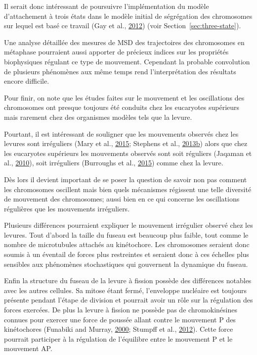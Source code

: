\documentclass[12pt,a4paper,twoside,openright]{book}
\begin{document}
Il serait donc intéressant de poursuivre l'implémentation du modèle
d'attachement à trois états dans le modèle initial de ségrégation des
chromosomes sur lequel est basé ce travail (Gay et al.,
\protect\hyperlink{ref-Gay2012a}{2012}) (voir
Section~\ref{sec:three-state}).

Une analyse détaillée des mesures de MSD des trajectoires des
chromosomes en métaphase pourraient aussi apporter de précieux indices
sur les propriétés biophysiques régulant ce type de mouvement. Cependant
la probable convolution de plusieurs phénomènes aux même temps rend
l'interprétation des résultats encore difficile.

Pour finir, on note que les études faites sur le mouvement et les
oscillations des chromosomes ont presque toujours été conduits chez les
eucaryotes supérieurs mais rarement chez des organismes modèles tels que
la levure.

Pourtant, il est intéressant de souligner que les mouvements observés
chez les levures sont irréguliers (Mary et al.,
\protect\hyperlink{ref-Mary2015}{2015}; Stephens et al.,
\protect\hyperlink{ref-Stephens2013a}{2013}\protect\hyperlink{ref-Stephens2013a}{b})
alors que chez les eucaryotes supérieurs les mouvements observés sont
soit réguliers (Jaqaman et al.,
\protect\hyperlink{ref-Jaqaman2010}{2010}), soit irréguliers (Burroughs
et al., \protect\hyperlink{ref-Burroughs2015}{2015}) comme chez la
levure.

Dès lors il devient important de se poser la question de savoir non pas
comment les chromosomes oscillent mais bien quels mécanismes régissent
une telle diversité de mouvement des chromosomes; aussi bien en ce qui
concerne les oscillations régulières que les mouvements irréguliers.

Plusieurs différences pourraient expliquer le mouvement irrégulier
observé chez les levures. Tout d'abord la taille du fuseau est beaucoup
plus faible, tout comme le nombre de microtubules attachés au
kinétochore. Les chromosomes seraient donc soumis à un éventail de
forces plus restreintes et seraient donc à ces échelles plus sensibles
aux phénomènes stochastiques qui gouvernent la dynamique du fuseau.

Enfin la structure du fuseau de la levure à fission possède des
différences notables avec les autres cellules. Sa mitose étant fermé,
l'enveloppe nucléaire est toujours présente pendant l'étape de division
et pourrait avoir un rôle sur la régulation des forces exercées. De plus
la levure à fission ne possède pas de chromokinésines connues pour
exercer une force de poussée allant contre le mouvement P des
kinétochores (Funabiki and Murray,
\protect\hyperlink{ref-Funabiki2000}{2000}; Stumpff et al.,
\protect\hyperlink{ref-Stumpff2012}{2012}). Cette force pourrait
participer à la régulation de l'équilibre entre le mouvement P et le
mouvement AP.
\end{document}
